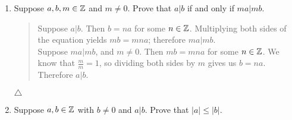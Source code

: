 \documentclass{hw}
\begin{document}
\begin{enumerate}
\item Suppose $a,b,m\in\mathbb{Z}$ and $m\neq 0$. Prove that $a|b$ if and only if $ma|mb$.
\begin{quote}
Suppose $a|b$. Then $b = na$ for some $n\in\mathbb{Z}$. Multiplying both sides of the equation yields
$mb = mna$; therefore $ma|mb$.\\
Suppose $ma|mb$, and $m\neq 0$. Then $mb = mna$ for some $n\in\mathbb{Z}$. We know that $\frac{m}{m} = 1$, so
dividing both sides by $m$ gives us $b = na$. Therefore $a|b$.
\end{quote}
$\triangle$

\item Suppose $a,b\in\mathbb{Z}$ with $b\neq 0$ and $a|b$. Prove that $|a| \leq |b|$.
\end{enumerate}
\end{document}
